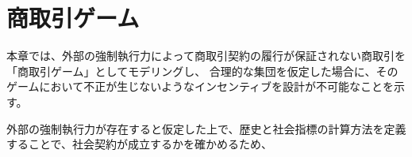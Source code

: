 \chapter{商取引ゲーム}
本章では、外部の強制執行力によって商取引契約の履行が保証されない商取引を「商取引ゲーム」としてモデリングし、
合理的な集団を仮定した場合に、そのゲームにおいて不正が生じないようなインセンティブを設計が不可能なことを示す。







外部の強制執行力が存在すると仮定した上で、歴史と社会指標の計算方法を定義することで、社会契約が成立するかを確かめるため、

